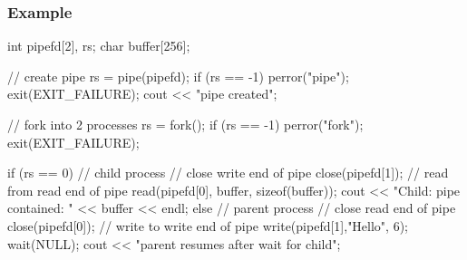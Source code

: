 \documentclass{report}
\begin{document}
        \subsubsection{Example}
        \bigbreak \noindent 
        \begin{cppcode}
            int pipefd[2], rs;
            char buffer[256];

            // create pipe
            rs = pipe(pipefd);
            if (rs == -1) { perror("pipe"); exit(EXIT_FAILURE); }
            cout << "pipe created\n";

            // fork into 2 processes
            rs = fork();
            if (rs == -1) { perror("fork"); exit(EXIT_FAILURE); }

            if (rs == 0) { // child process	
                // close write end of pipe
                close(pipefd[1]);
                // read from read end of pipe
                read(pipefd[0], buffer, sizeof(buffer));
                cout << "Child: pipe contained: " << buffer << endl;			
            } else {  // parent process	
                // close read end of pipe
                close(pipefd[0]);
                // write to write end of pipe
                write(pipefd[1],"Hello", 6);
                wait(NULL);	
                cout << "parent resumes after wait for child\n";
            }	
        \end{cppcode}

        \pagebreak 
\end{document}
